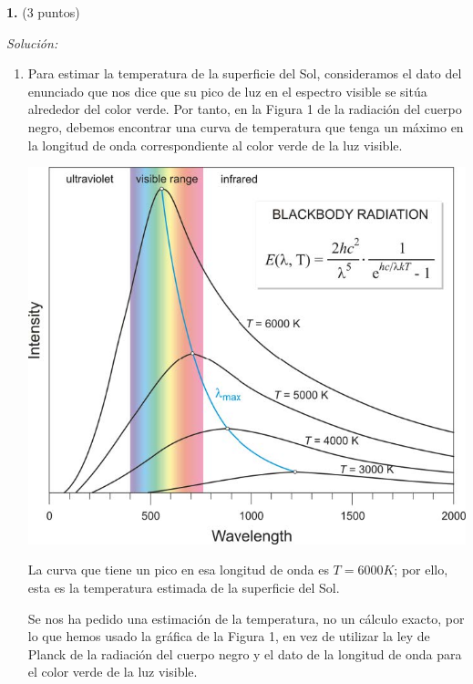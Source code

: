 \textbf{1.} (3 puntos)


\vspace{20px}
\textit{Solución:}
\\

\begin{enumerate}
[label=\alph*)]
    \item Para estimar la temperatura de la superficie del Sol, consideramos el dato del enunciado que nos dice que su pico de luz
    en el espectro visible se sitúa alrededor del color verde. Por tanto, en la Figura 1 de la radiación del cuerpo negro,
    debemos encontrar una curva de temperatura que tenga un máximo en la longitud de onda correspondiente al color verde de la luz visible.\\

    \begin{center}
        \includegraphics[scale=0.45]{files/img1}
    \end{center}
    \vspace{20px}

    La curva que tiene un pico en esa longitud de onda es $T = 6000K$; por ello, esta es la temperatura
    estimada de la superficie del Sol.

    Se nos ha pedido una estimación de la temperatura, no un cálculo exacto,
    por lo que hemos usado la gráfica de la Figura 1, en vez de
    utilizar la ley de Planck de la radiación del cuerpo negro y el dato de la longitud de onda para el color verde de la luz visible.


\end{enumerate}
